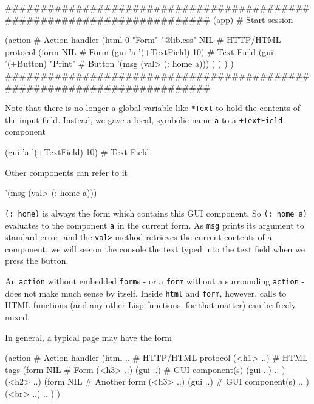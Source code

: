 \begin{wideverbatim}
########################################################################
(app)                                              # Start session

(action                                            # Action handler
   (html 0 "Form" "@lib.css" NIL                   # HTTP/HTML protocol
      (form NIL                                    # Form
         (gui 'a '(+TextField) 10)                 # Text Field
         (gui '(+Button) "Print"                   # Button
            '(msg (val> (: home a))) ) ) ) )
########################################################################
\end{wideverbatim}

Note that there is no longer a global variable like \texttt{*Text} to hold the
contents of the input field. Instead, we gave a local, symbolic name
 \texttt{a}  to a \texttt{+TextField} component


\begin{wideverbatim}
(gui 'a '(+TextField) 10)                 # Text Field
\end{wideverbatim}

Other components can refer to it


\begin{wideverbatim}
'(msg (val> (: home a)))
\end{wideverbatim}

\texttt{(: home)} is always the form which contains this GUI component. So
\texttt{(: home a)} evaluates to the component  \texttt{a}  in the current form. As
\texttt{msg} prints its argument to standard error, and the \texttt{val>} method
retrieves the current contents of a component, we will see on the
console the text typed into the text field when we press the button.

An \texttt{action} without embedded  \texttt{form}s - or a \texttt{form} without a surrounding
\texttt{action} - does not make much sense by itself. Inside \texttt{html} and \texttt{form},
however, calls to HTML functions (and any other Lisp functions, for that
matter) can be freely mixed.

In general, a typical page may have the form


\begin{wideverbatim}
(action                                            # Action handler
   (html ..                                        # HTTP/HTML protocol
      (<h1> ..)                                    # HTML tags
      (form NIL                                    # Form
         (<h3> ..)
         (gui ..)                                  # GUI component(s)
         (gui ..)
         .. )
      (<h2> ..)
      (form NIL                                    # Another form
         (<h3> ..)
         (gui ..)                                  # GUI component(s)
         .. )
      (<br> ..)
      .. ) )
\end{wideverbatim}


